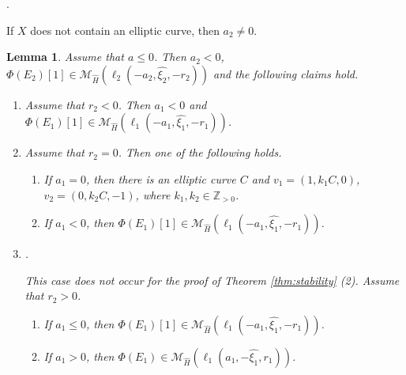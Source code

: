 \documentclass[10pt]{amsart}
\def\cal{\mathcal}
\def\Bbb{\mathbb}
\newenvironment{NB}{
\color{red}{\bf NB}. \footnotesize 
}{}
\numberwithin{equation}{section}
\theoremstyle{plain}
\newtheorem{lem}[thm]{Lemma}
\theoremstyle{definition}
\theoremstyle{remark}
\begin{document}
\begin{NB}
If $X$ does not contain an elliptic curve, then 
$a_2 \ne 0$.
\end{NB}


\begin{lem}\label{lem:a<0}
Assume that $a \leq 0$.
Then
$a_2<0$,
$\Phi(E_2)[1] \in {\cal M}_{\widehat{H}}(\ell_2(-a_2,\widehat{\xi_2},-r_2))$
and the following claims hold.
\begin{enumerate}
\item[(1)]
Assume that $r_2<0$.
Then $a_1<0$ and $\Phi(E_1)[1] \in 
{\cal M}_{\widehat{H}}(\ell_1(-a_1,\widehat{\xi_1},-r_1))$.
\item[(2)]
Assume that $r_2=0$. Then one of the following holds.
\begin{enumerate}
\item
If $a_1=0$, then there is an elliptic curve $C$ and
$v_1=(1,k_1 C,0)$, $v_2=(0,k_2 C,-1)$, where $k_1,k_2 \in {\Bbb Z}_{>0}$.
\item
If $a_1<0$, then $\Phi(E_1)[1] \in {\cal M}_{\widehat{H}}(\ell_1(-a_1,\widehat{\xi_1},-r_1))$.
\end{enumerate}
\item[(3)]
\begin{NB}
This case does not occur for the proof of Theorem \ref{thm:stability} (2).
\end{NB}
Assume that $r_2>0$.
\begin{enumerate}
\item
 If $a_1 \leq 0$, then $\Phi(E_1)[1] \in {\cal M}_{\widehat{H}}(\ell_1(-a_1,\widehat{\xi_1},-r_1))$.
\item
If $a_1>0$, then $\Phi(E_1) \in  {\cal M}_{\widehat{H}}(\ell_1(a_1,-\widehat{\xi_1},r_1))$.
\end{enumerate}
\end{enumerate}
\end{lem}
\end{document}
